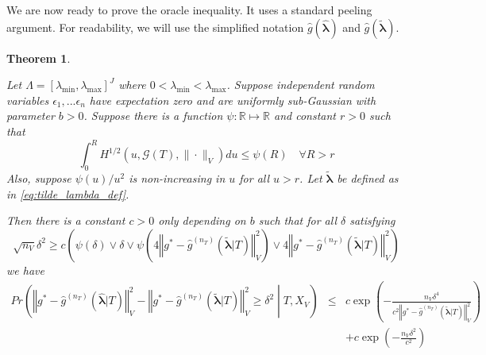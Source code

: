\documentclass[12pt]{article}
\newtheorem{theorem}{Theorem}
\begin{document}
We are now ready to prove the oracle inequality. It uses a standard peeling argument. For readability, we will use the simplified notation $\hat{g}(\hat{\boldsymbol{\lambda}})$ and $\hat{g}(\tilde{\boldsymbol{\lambda}})$.

\begin{theorem}
\label{thrm:train_val_complicated}

Let $\Lambda=[\lambda_{\min},\lambda_{\max}]^{J}$ where $0 < \lambda_{\min} < \lambda_{\max}$. Suppose independent random variables $\epsilon_1, ... \epsilon_n$ have expectation zero and are uniformly sub-Gaussian with parameter $b > 0$.
Suppose there is a function $\psi:\mathbb{R}\mapsto\mathbb{R}$ and constant $r > 0$ such that
\begin{equation}
\label{eq:dudley_bound}
\int_{0}^{R}H^{1/2}(u,\mathcal{G}(T),\|\cdot\|_{V})du\le\psi(R) \quad \forall R>r
\end{equation}
Also, suppose $\psi\left(u\right)/u^{2}$ is non-increasing in $u$ for all $u > r$.
Let $\tilde{\boldsymbol \lambda}$ be defined as in \eqref{eq:tilde_lambda_def}.

Then there is a constant $c>0$ only depending on $b$ such that for all $\delta$ satisfying
\begin{equation}
\label{eq:train_val_delta_condn}
\sqrt{n_V}\delta^{2}
\ge
c \left ( 
\psi(\delta)
\vee 
\delta
\vee
\psi \left (
4\left\Vert g^* - \hat{g}^{(n_T)}( \tilde{\boldsymbol{\lambda}} | T)\right\Vert_{V}^2
\right ) 
\vee
4 \left\Vert g^* - \hat{g}^{(n_T)}( \tilde{\boldsymbol{\lambda}} | T)\right\Vert_{V}^2
\right )
\end{equation}
we have
\begin{eqnarray*}
	Pr\left(
	\left\Vert g^* - \hat{g}^{(n_T)}( \hat{\boldsymbol{\lambda}} | T) \right\Vert _{V}^2 -
	\left\Vert g^* - \hat{g}^{(n_T)}( \tilde{\boldsymbol{\lambda}} | T) \right\Vert _{V}^2
	\ge\delta^2
	\middle | 
	T, X_V
	\right )
	&\le& c\exp\left(-\frac{n_{V}\delta^{4}}{
		c^{2}
		\left\Vert g^* - \hat{g}^{(n_T)}( \tilde{\boldsymbol{\lambda}} | T) \right\Vert _{V}^2
	}\right) \\
	&& +c\exp\left(-\frac{n_{V}\delta^{2}}{c^{2}}\right) \\ 
\end{eqnarray*}
\end{theorem}
\end{document}
